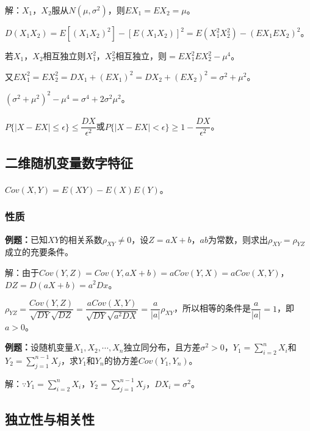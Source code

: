 解：$X_1$，$X_2$服从$N(\mu,\sigma^2)$，则$EX_1=EX_2=\mu$。

$D(X_1X_2)=E[(X_1X_2)^2]-[E(X_1X_2)]^2=E(X_1^2X_2^2)-(EX_1EX_2)^2$。

若$X_1$，$X_2$相互独立则$X_1^2$，$X_2^2$相互独立，则$=EX_1^2EX_2^2-\mu^4$。

又$EX_1^2=EX_2^2=DX_1+(EX_1)^2=DX_2+(EX_2)^2=\sigma^2+\mu^2$。

$(\sigma^2+\mu^2)^2-\mu^4=\sigma^4+2\sigma^2\mu^2$。

\paragraph{}

$P\{\vert X-EX\vert\leqslant\epsilon\}\leqslant\dfrac{DX}{\epsilon^2}$或$P\{\vert X-EX\vert<\epsilon\}\geqslant1-\dfrac{DX}{\epsilon^2}$。

\subsection{二维随机变量数字特征}

\paragraph{}

$Cov(X,Y)=E(XY)-E(X)E(Y)$。

\subsubsection{性质}

\textbf{例题：}已知$XY$的相关系数$\rho_{XY}\neq0$，设$Z=aX+b$，$ab$为常数，则求出$\rho_{XY}=\rho_{YZ}$成立的充要条件。

解：由于$Cov(Y,Z)=Cov(Y,aX+b)=aCov(Y,X)=aCov(X,Y)$，$DZ=D(aX+b)=a^2Dx$。

$\rho_{YZ}=\dfrac{Cov(Y,Z)}{\sqrt{DY}\sqrt{DZ}}=\dfrac{aCov(X,Y)}{\sqrt{DY}\sqrt{a^2DX}}=\dfrac{a}{\vert a\vert}\rho_{XY}$，所以相等的条件是$\dfrac{a}{\vert a\vert}=1$，即$a>0$。

\textbf{例题：}设随机变量$X_1,X_2,\cdots,X_n$独立同分布，且方差$\sigma^2>0$，$Y_1=\sum\limits_{i=2}^nX_i$和$Y_2=\sum\limits_{j=1}^{n-1}X_j$，求$Y_1$和$Y_n$的协方差$Cov(Y_1,Y_n)$。

解：$\because Y_1=\sum\limits_{i=2}^nX_i$，$Y_2=\sum\limits_{j=1}^{n-1}X_j$，$DX_i=\sigma^2$。

\subsection{独立性与相关性}

